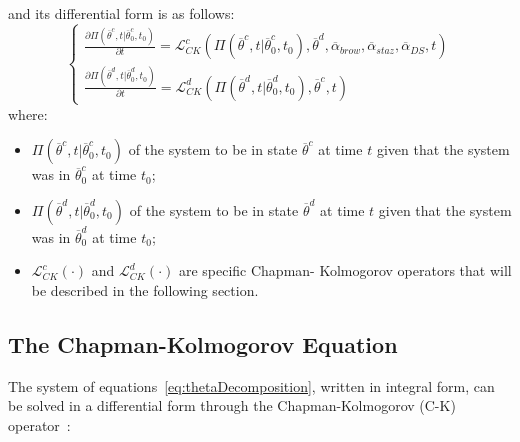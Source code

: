and its differential form is as follows:
\begin{equation}
\label{eq:chapKolmogDiffFormContDisct}
\left\{\begin{matrix}
\frac{\partial \Pi \left (\overline{\theta}^{c},t|\overline{\theta}_{0}^{c},t_{0}
\right ) }{\partial t} = \mathcal{L}_{CK}^{c}  \left (     \Pi \left
(\overline{\theta}^{c},t|\overline{\theta}_{0}^{c},t_{0} \right ),
\overline{\theta}^{d},\overline{\alpha}_{brow},\overline{\alpha}_{staz},
\overline{\alpha}_{DS},t  \right )
\\
\frac{\partial \Pi \left (\overline{\theta}^{d},t|\overline{\theta}_{0}^{d},t_{0}
\right ) }{\partial t} = \mathcal{L}_{CK}^{d}  \left (     \Pi \left
(\overline{\theta}^{d},t|\overline{\theta}_{0}^{d},t_{0} \right ),
\overline{\theta}^{c},t  \right )
\end{matrix}\right.
\end{equation}
where:
\begin{itemize}
 \item  $\Pi \left (\overline{\theta}^{c},t|\overline{\theta}_{0}^{c},t_{0} \right
 )$ of the system to be in state $\overline{\theta}^{c}$ at time $t$ given that
 the system was in $\overline{\theta}^{c}_{0}$ at time $t_{0}$;
 \item $\Pi \left (\overline{\theta}^{d},t|\overline{\theta}_{0}^{d},t_{0} \right
 )$ of the system to be in state $\overline{\theta}^{d}$ at time $t$ given
 that the system was in $\overline{\theta}^{d}_{0}$ at time $t_{0}$;
 \item $\mathcal{L}_{CK}^{c} \left ( \cdot  \right )$ and
 $\mathcal{L}_{CK}^{d} \left ( \cdot  \right )$  are specific Chapman-
 Kolmogorov operators that will be described in the following section.
\end{itemize}
%
%
%
%
%
\subsection{The Chapman-Kolmogorov Equation}
\label{sec:ChapmanKolmogorov }
The system of equations~\ref{eq:thetaDecomposition}, written in integral
form, can be solved in a differential form through the Chapman-Kolmogorov (C-K)
operator~\cite{ProbReactoDynamicsDevooght}:

